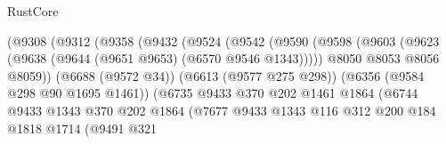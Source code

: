 \begin{lexlean}{RustCore}
\begin{coremodule}
{\begin{coremodule}
{{{{{{{{{{{{{{{{{{{{{{{{{{{{{{{{{{{{{{{{{{{{{{{                                    (@9308
                                      (@9312
                                        (@9358
                                          (@9432
                                            (@9524
                                              (@9542
                                                (@9590
                                                  (@9598
                                                    (@9603
                                                      (@9623
                                                        (@9638
                                                          (@9644
                                                            (@9651 @9653)
                                                            (@6570 @9546 @1343)))))
                                                    @8050
                                                    @8053
                                                    @8056
                                                    @8059))
                                                (@6688 (@9572 @34))
                                                (@6613 (@9577 @275 @298))
                                                (@6356 (@9584 @298 @90 @1695 @1461))
                                                (@6735
                                                  @9433
                                                  @370
                                                  @202
                                                  @1461
                                                  @1864
                                                  (@6744
                                                    @9433
                                                    @1343
                                                    @370
                                                    @202
                                                    @1864
                                                    (@7677
                                                      @9433
                                                      @1343
                                                      @116
                                                      @312
                                                      @200
                                                      @184
                                                      @1818
                                                      @1714
                                                      (@9491
                                                        @321
}}}}}}}}}}}}}}}}}}}}}}}}}}}}}}}}}}}}}}}}}}}}}}}
\end{coremodule}}
\end{coremodule}
\end{lexlean}
